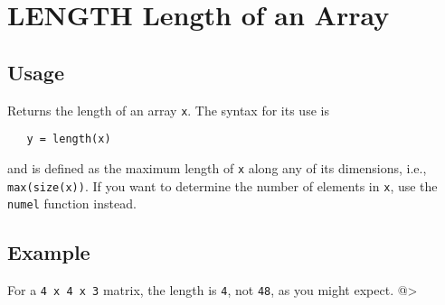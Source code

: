 \section{LENGTH Length of an Array}

\subsection{Usage}

Returns the length of an array \verb|x|.  The syntax for its use
is 
\begin{verbatim}
   y = length(x)
\end{verbatim}
and is defined as the maximum length of \verb|x| along any of its
dimensions, i.e., \verb|max(size(x))|.  If you want to determine the
number of elements in \verb|x|, use the \verb|numel| function instead.
\subsection{Example}

For a \verb|4 x 4 x 3| matrix, the length is \verb|4|, not \verb|48|, as you 
might expect.
@>
